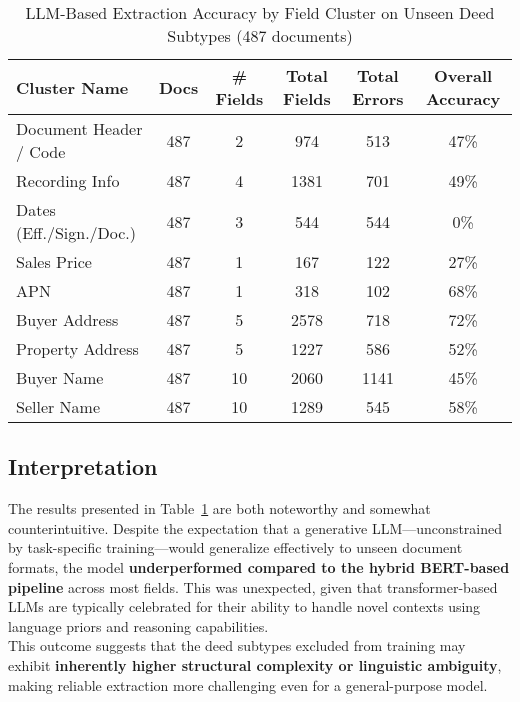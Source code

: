 \documentclass{article}
\begin{document}
\begin{table}[H]
\centering
\footnotesize
\renewcommand{\arraystretch}{1.2}
\begin{tabular}{|l|c|c|c|c|c|}
\hline
\textbf{Cluster Name} & \textbf{Docs} & \textbf{\# Fields} & \textbf{Total Fields} & \textbf{Total Errors} & \textbf{Overall Accuracy} \\
\hline
Document Header / Code     & 487 & 2  & 974  & 513  & 47\% \\
Recording Info             & 487 & 4  & 1381 & 701  & 49\% \\
Dates (Eff./Sign./Doc.)    & 487 & 3  & 544  & 544  & 0\%  \\
Sales Price                & 487 & 1  & 167  & 122  & 27\% \\
APN                        & 487 & 1  & 318  & 102  & 68\% \\
Buyer Address              & 487 & 5  & 2578 & 718  & 72\% \\
Property Address           & 487 & 5  & 1227 & 586  & 52\% \\
Buyer Name                 & 487 & 10 & 2060 & 1141 & 45\% \\
Seller Name                & 487 & 10 & 1289 & 545  & 58\% \\
\hline

\end{tabular}
\caption{LLM-Based Extraction Accuracy by Field Cluster on Unseen Deed Subtypes (487 documents)}
\label{tab:llm_accuracy_unseen}
\end{table}

\subsection{Interpretation}

The results presented in Table~\ref{tab:llm_accuracy_unseen} are both noteworthy and somewhat counterintuitive. Despite the expectation that a generative LLM—unconstrained by task-specific training—would generalize effectively to unseen document formats, the model \textbf{underperformed compared to the hybrid BERT-based pipeline} across most fields. This was unexpected, given that transformer-based LLMs are typically celebrated for their ability to handle novel contexts using language priors and reasoning capabilities. \\

This outcome suggests that the deed subtypes excluded from training may exhibit \textbf{inherently higher structural complexity or linguistic ambiguity}, making reliable extraction more challenging even for a general-purpose model. \\
\end{document}

